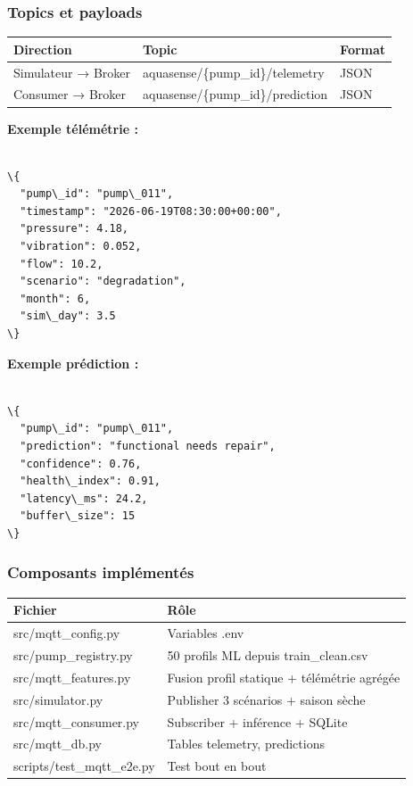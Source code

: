 \documentclass[11pt,a4paper]{report}
\begin{document}
\subsubsection{Topics et payloads}



\begin{longtable}{@{}lll@{}}
\toprule
Direction & Topic & Format \\
\midrule
Simulateur → Broker & aquasense/\{pump\_id\}/telemetry & JSON \\
Consumer → Broker & aquasense/\{pump\_id\}/prediction & JSON \\
\bottomrule
\end{longtable}




\textbf{Exemple télémétrie :}



\begin{lstlisting}

\{
  "pump\_id": "pump\_011",
  "timestamp": "2026-06-19T08:30:00+00:00",
  "pressure": 4.18,
  "vibration": 0.052,
  "flow": 10.2,
  "scenario": "degradation",
  "month": 6,
  "sim\_day": 3.5
\}

\end{lstlisting}



\textbf{Exemple prédiction :}



\begin{lstlisting}

\{
  "pump\_id": "pump\_011",
  "prediction": "functional needs repair",
  "confidence": 0.76,
  "health\_index": 0.91,
  "latency\_ms": 24.2,
  "buffer\_size": 15
\}

\end{lstlisting}



\subsubsection{Composants implémentés}



\begin{longtable}{@{}ll@{}}
\toprule
Fichier & Rôle \\
\midrule
src/mqtt\_config.py & Variables .env \\
src/pump\_registry.py & 50 profils ML depuis train\_clean.csv \\
src/mqtt\_features.py & Fusion profil statique + télémétrie agrégée \\
src/simulator.py & Publisher 3 scénarios + saison sèche \\
src/mqtt\_consumer.py & Subscriber + inférence + SQLite \\
src/mqtt\_db.py & Tables telemetry, predictions \\
scripts/test\_mqtt\_e2e.py & Test bout en bout \\
\bottomrule
\end{longtable}
\end{document}
